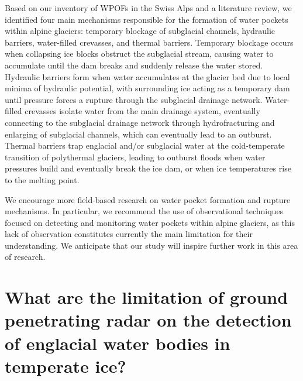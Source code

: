 Based on our inventory of WPOFs in the Swiss Alps and a literature review, we identified four main mechanisms responsible for the formation of water pockets within alpine glaciers: temporary blockage of subglacial channels, hydraulic barriers, water-filled crevasses, and thermal barriers. Temporary blockage occurs when collapsing ice blocks obstruct the subglacial stream, causing water to accumulate until the dam breaks and suddenly release the water stored. Hydraulic barriers form when water accumulates at the glacier bed due to local minima of hydraulic potential, with surrounding ice acting as a temporary dam until pressure forces a rupture through the subglacial drainage network. Water-filled crevasses isolate water from the main drainage system, eventually connecting to the subglacial drainage network through hydrofracturing and enlarging of subglacial channels, which can eventually lead to an outburst. Thermal barriers trap englacial and/or subglacial water at the cold-temperate transition of polythermal glaciers, leading to outburst floods when water pressures build and eventually break the ice dam, or when ice temperatures rise to the melting point. 
%

We encourage more field-based research on water pocket formation and rupture mechanisms. In particular, we recommend the use of observational techniques focused on detecting and monitoring water pockets within alpine glaciers, as this lack of observation constitutes currently the main limitation for their understanding. We anticipate that our study will inspire further work in this area of research.


\section{What are the limitation of ground penetrating radar on the detection of englacial water bodies in temperate ice?}

